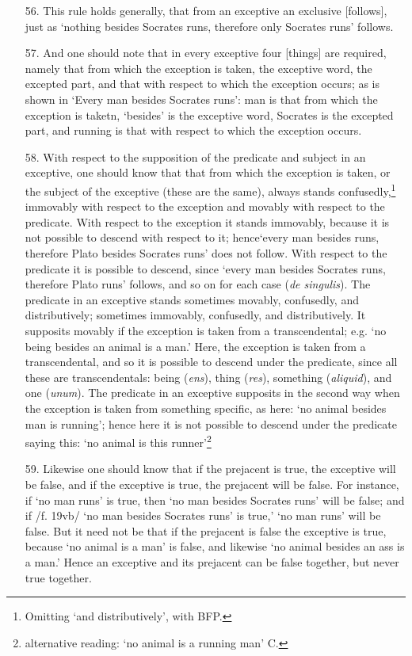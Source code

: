 \documentclass[]{article}
\begin{document}
\begin{itemize}
\item[56.] This rule holds generally, that from an exceptive an exclusive [follows], just as `nothing besides Socrates runs, therefore only Socrates runs' follows.
\item[57.] And one should note that in every exceptive four [things] are required, namely that from which the exception is taken, the exceptive word, the excepted part, and that with respect to which the exception occurs; as is shown in `Every man besides Socrates runs': man is that from which the exception is taketn, `besides' is the exceptive word, Socrates is the excepted part, and running is that with respect to which the exception occurs.
\item[58.] With respect to the supposition of the predicate and subject in an exceptive, one should know that that from which the exception is taken, or the subject of the exceptive (these are the same), always stands confusedly,\footnote{Omitting `and distributively', with BFP.} immovably with respect to the exception and movably with respect to the predicate. With respect to the exception it stands immovably, because it is not possible to descend with respect to it; hence`every man besides runs, therefore Plato besides Socrates runs' does not follow. With respect to the predicate it is possible to descend, since `every man besides Socrates runs, therefore Plato runs' follows, and so on for each case (\textit{de singulis}). The predicate in an exceptive stands sometimes movably, confusedly, and distributively; sometimes immovably, confusedly, and distributively. It supposits movably if the exception is taken from a transcendental; e.g. `no being besides an animal is a man.' Here, the exception is taken from a transcendental, and so it is possible to descend under the predicate, since all these are transcendentals: being (\textit{ens}), thing (\textit{res}), something (\textit{aliquid}), and one (\textit{unum}). The predicate in an exceptive supposits in the second way when the exception is taken from something specific, as here: `no animal besides man is running'; hence here it is not possible to descend under the predicate saying this: `no animal is this runner'\footnote{alternative reading: `no animal is a running man' C.}
\item[59.] Likewise one should know that if the prejacent is true, the exceptive will be false, and if the exceptive is true, the prejacent will be false. For instance, if `no man runs' is true, then `no man besides Socrates runs' will be false; and if /f. 19vb/ `no man besides Socrates runs' is true,' `no man runs' will be false. But it need not be that if the prejacent is false the exceptive is true, because `no animal is a man' is false, and likewise `no animal besides an ass is a man.' Hence an exceptive and its prejacent can be false together, but never true together.

\end{itemize}
\end{document}
